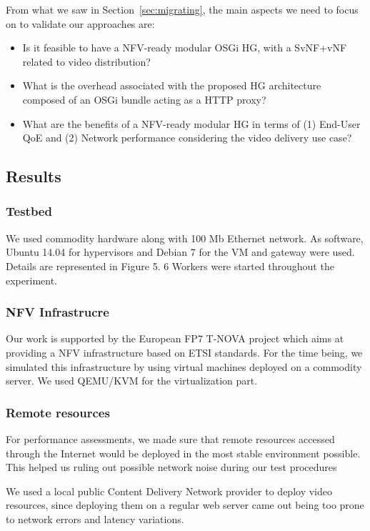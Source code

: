 From what we saw in Section~\ref{sec:migrating}, the main aspects we need to focus on to validate our approaches are:
\begin{itemize}
	\item Is it feasible to have a NFV-ready modular OSGi HG, with a SvNF+vNF related to video distribution?
	\item What is the overhead associated with the proposed HG architecture composed of an OSGi bundle acting as a HTTP proxy?
	\item What are the benefits of a NFV-ready modular HG in terms of (1) End-User QoE and (2) Network performance considering the video delivery use case?
\end{itemize}


\subsection{Results}
  \subsubsection{Testbed}
   We used commodity hardware along with 100 Mb Ethernet network.
   As software, Ubuntu 14.04 for hypervisors and Debian 7 for the VM and gateway were used.
   Details are represented in Figure 5. 6 Workers were started throughout the experiment.
  \subsubsection{NFV Infrastrucre}
   Our work is supported by the European FP7 T-NOVA project which aims at providing a NFV infrastructure based on ETSI standards.
   For the time being, we simulated this infrastructure by using virtual machines deployed on a commodity server.
   We used QEMU/KVM for the virtualization part.
  \subsubsection{Remote resources}
   For performance assessments, we made sure that remote resources accessed through the Internet would be deployed in the most stable environment possible.
   This helped us ruling out possible network noise during our test procedures
   
   We used a local public Content Delivery Network provider to deploy video resources, since deploying them on a regular web server came out being too prone to network errors and latency variations.
